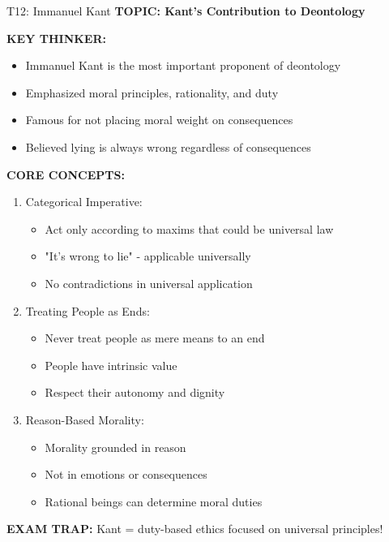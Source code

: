 \documentclass[8pt]{beamer}
\begin{document}
	\begin{frame}{T12: Immanuel Kant}
		\fontsize{6.5}{7.5}\selectfont
		\textbf{TOPIC: Kant's Contribution to Deontology}
		
		\vspace{0.1cm}
		\textbf{KEY THINKER:}
		\begin{itemize}
			\item Immanuel Kant is the most important proponent of deontology
			\item Emphasized moral principles, rationality, and duty
			\item Famous for not placing moral weight on consequences
			\item Believed lying is always wrong regardless of consequences
		\end{itemize}
		
		\vspace{0.1cm}
		\textbf{CORE CONCEPTS:}
		\begin{enumerate}
			\item \textcolor{myblue}{Categorical Imperative:}
			\begin{itemize}
				\item Act only according to maxims that could be universal law
				\item "It's wrong to lie" - applicable universally
				\item No contradictions in universal application
			\end{itemize}
			\item \textcolor{myblue}{Treating People as Ends:}
			\begin{itemize}
				\item Never treat people as mere means to an end
				\item People have intrinsic value
				\item Respect their autonomy and dignity
			\end{itemize}
			\item \textcolor{myblue}{Reason-Based Morality:}
			\begin{itemize}
				\item Morality grounded in reason
				\item Not in emotions or consequences
				\item Rational beings can determine moral duties
			\end{itemize}
		\end{enumerate}
		
		\textcolor{myred}{\textbf{EXAM TRAP:}} Kant = \textcolor{myblue}{duty-based ethics focused on universal principles}!
	\end{frame}
	
\end{document}
